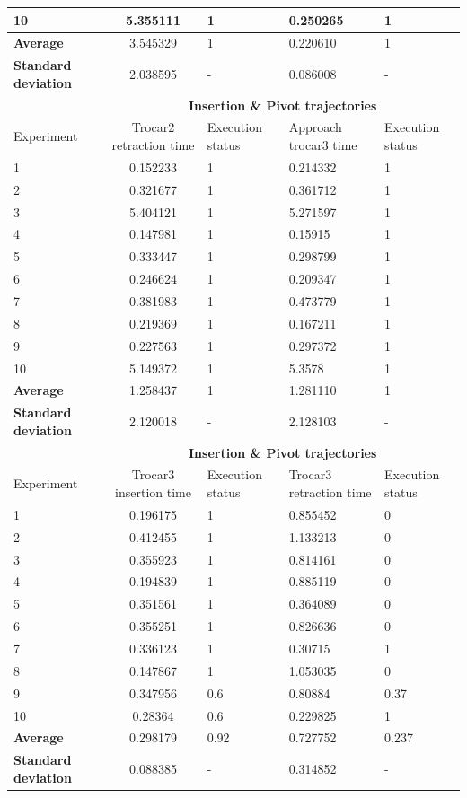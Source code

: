 \begin{longtable}{|p{2cm}|c|p{2cm}|p{2cm}|p{2cm}|}
10  & 5.355111	& 1	& 0.250265	& 1 \\
\hline
\textbf{Average} & 3.545329	& 1	& 0.220610	& 1 \\
\hline
\textbf{Standard deviation} & 	2.038595 &	- &	0.086008 & - \\
\hline
                          & \multicolumn{4}{c}{\textbf{Insertion \& Pivot trajectories}}                     \vline \\
\hline
Experiment                & Trocar2 retraction time & Execution status & Approach trocar3 time & Execution status  \\
\hline
1 & 0.152233	& 1	& 0.214332	& 1 \\
2 & 0.321677	& 1	& 0.361712	& 1 \\
3 & 5.404121	& 1	& 5.271597	& 1 \\
4 & 0.147981	& 1	& 0.15915	& 1 \\
5 & 0.333447	& 1	& 0.298799	& 1 \\
6 & 0.246624	& 1	& 0.209347	& 1 \\
7 & 0.381983	& 1	& 0.473779	& 1 \\
8 & 0.219369	& 1	& 0.167211	& 1 \\
9 & 0.227563	& 1	& 0.297372	& 1 \\
10  & 5.149372	& 1	& 5.3578	& 1 \\
\hline
\textbf{Average} & 1.258437	& 1	& 1.281110	& 1 \\
\hline
\textbf{Standard deviation} & 	2.120018 &	- &	2.128103 & - \\
\hline
                          & \multicolumn{4}{c}{\textbf{Insertion \& Pivot trajectories}}                     \vline \\
\hline
Experiment                & Trocar3 insertion time & Execution status & Trocar3 retraction time & Execution status  \\
\hline
1 & 0.196175	& 1	& 0.855452	& 0 \\
2 & 0.412455	& 1	& 1.133213	& 0 \\
3 & 0.355923	& 1	& 0.814161	& 0 \\
4 & 0.194839	& 1	& 0.885119	& 0 \\
5 & 0.351561	& 1	& 0.364089	& 0 \\
6 & 0.355251	& 1	& 0.826636	& 0 \\
7 & 0.336123	& 1	& 0.30715	& 1 \\
8 & 0.147867	& 1	& 1.053035	& 0 \\
9 & 0.347956	& 0.6	& 0.80884	& 0.37  \\
10  & 0.28364	& 0.6	& 0.229825	& 1 \\
\hline
\textbf{Average} & 	0.298179	& 0.92 &	0.727752	& 0.237 \\
\hline
\textbf{Standard deviation} & 	0.088385 &	- &	0.314852 & - \\
\hline


\end{longtable}
